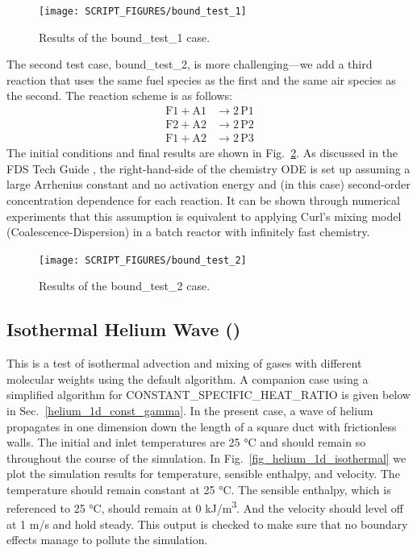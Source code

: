 \documentclass[11pt]{book}
\begin{document}
\begin{figure}[!ht]
   \centering
   \texttt{[image: SCRIPT\_FIGURES/bound\_test\_1]}
   \caption[Results of the {\ct bound\_test\_1} case]{Results of the {\ct bound\_test\_1} case.}
   \label{fig:bound_test_1}
\end{figure}

The second test case, {\ct bound\_test\_2}, is more challenging---we add a third reaction that uses the same fuel species as the first and the same air species as the second.  The reaction scheme is as follows:
\begin{align}
\mathrm{F1} + \mathrm{A1} &\rightarrow 2\,\mathrm{P1} \\
\mathrm{F2} + \mathrm{A2} &\rightarrow 2\,\mathrm{P2} \\
\mathrm{F1} + \mathrm{A2} &\rightarrow 2\,\mathrm{P3}
\end{align}
The initial conditions and final results are shown in Fig.~\ref{fig:bound_test_2}.  As discussed in the FDS Tech Guide \cite{FDS_Math_Guide}, the right-hand-side of the chemistry ODE is set up assuming a large Arrhenius constant and no activation energy and (in this case) second-order concentration dependence for each reaction.  It can be shown through numerical experiments that this assumption is equivalent to applying Curl's mixing model (Coalescence-Dispersion) \cite{Curl:1} in a batch reactor with infinitely fast chemistry.
\begin{figure}[!ht]
   \centering
   \texttt{[image: SCRIPT\_FIGURES/bound\_test\_2]}
   \caption[Results of the {\ct bound\_test\_2} case]{Results of the {\ct bound\_test\_2} case.}
   \label{fig:bound_test_2}
\end{figure}

\subsection{Isothermal Helium Wave (\texorpdfstring{}{helium\_1d\_isothermal})}
\label{helium_1d_isothermal}
\label{helium_2d_isothermal}

This is a test of isothermal advection and mixing of gases with different molecular weights using the default algorithm.  A companion case using a simplified algorithm for {\ct CONSTANT\_SPECIFIC\_HEAT\_RATIO} is given below in Sec.~\ref{helium_1d_const_gamma}.  In the present case, a wave of helium propagates in one dimension down the length of a square duct with frictionless walls.  The initial and inlet temperatures are 25 \si{\degreeCelsius} and should remain so throughout the course of the simulation. In Fig.~\ref{fig_helium_1d_isothermal} we plot the simulation results for temperature, sensible enthalpy, and velocity.  The temperature should remain constant at 25 \si{\degreeCelsius}.  The sensible enthalpy, which is referenced to 25 \si{\degreeCelsius}, should remain at 0 \si{kJ/m^3}.  And the velocity should level off at 1 m/s and hold steady.  This output is checked to make sure that no boundary effects manage to pollute the simulation.
\end{document}

